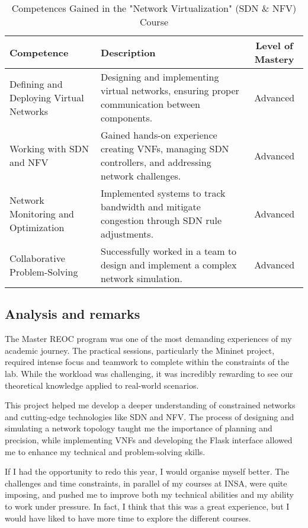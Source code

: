 \begin{table}[H]
    \centering
    \renewcommand{\arraystretch}{1.5} %
    \begin{tabular}{|p{3.5cm}|p{8cm}|c|}
    \hline
    \rowcolor[gray]{0.8}
    \textbf{Competence} & \textbf{Description} & \textbf{Level of Mastery} \\
    \hline
    Defining and Deploying Virtual Networks & Designing and implementing virtual networks, ensuring proper communication between components. & Advanced \\
    \hline
    Working with SDN and NFV & Gained hands-on experience creating VNFs, managing SDN controllers, and addressing network challenges. & Advanced \\
    \hline
    Network Monitoring and Optimization & Implemented systems to track bandwidth and mitigate congestion through SDN rule adjustments. & Advanced\\
    \hline
    Collaborative Problem-Solving & Successfully worked in a team to design and implement a complex network simulation. & Advanced\\
    \hline
    \end{tabular}
    \caption{Competences Gained in the "Network Virtualization" (SDN \& NFV) Course}
\end{table}

\subsection{Analysis and remarks}
\indent \indent The Master REOC program was one of the most demanding experiences of my academic journey.
The practical sessions, particularly the Mininet project, required intense focus and teamwork to complete within the constraints of the lab.
While the workload was challenging, it was incredibly rewarding to see our theoretical knowledge applied to real-world scenarios.

This project helped me develop a deeper understanding of constrained networks and cutting-edge technologies like SDN and NFV.
The process of designing and simulating a network topology taught me the importance of planning and precision, while implementing VNFs and developing the Flask interface allowed me to enhance my technical and problem-solving skills.

If I had the opportunity to redo this year, I would organise myself better.
The challenges and time constraints, in parallel of my courses at INSA, were quite imposing, and pushed me to improve both my technical abilities and my ability to work under pressure.
In fact, I think that this was a great experience, but I would have liked to have more time to explore the different courses.